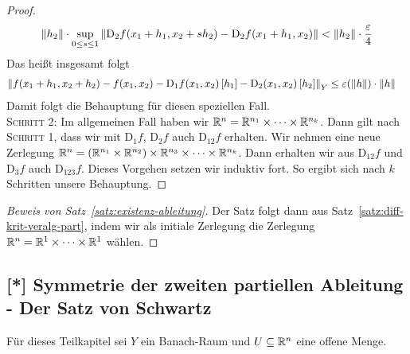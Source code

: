 \begin{satz}
\begin{proof}
\begin{alignat*}{2}
            &&\norm{h_2}\cdot\sup_{0\leq s \leq 1} \norm{\text{D}_2 f\of{x_1 + h_1, x_2 + sh_2} - \text{D}_2 f\of{x_1 + h_1, x_2}} &< \norm{h_2} \cdot \frac{\varepsilon}{4}
        \end{alignat*}
        Das heißt insgesamt folgt
        \begin{align*}
            \norm{f\of{x_1 + h_1, x_2 + h_2} - f\of{x_1, x_2} - \text{D}_1 f\of{x_1, x_2}\interv{h_1} - \text{D}_2\of{x_1, x_2}\interv{h_2}}_Y &\leq \varepsilon\of{\norm{h}}\cdot\norm{h}
        \end{align*}
        Damit folgt die Behauptung für diesen speziellen Fall.\\[5pt] \textsc{Schritt 2}: Im allgemeinen Fall haben wir $\mathbb{R}^n = \mathbb{R}^{n_1}\times\dots\times\mathbb{R}^{n_k}$. Dann gilt nach \textsc{Schritt 1}, dass wir mit $\text{D}_1 f$, $\text{D}_2 f$ auch $\text{D}_{12} f$ erhalten. Wir nehmen eine neue Zerlegung $\mathbb{R}^n = \left(\mathbb{R}^{n_1}\times\mathbb{R}^{n_2}\right)\times \mathbb{R}^{n_3}\times\dots\times\mathbb{R}^{n_k}$. Dann erhalten wir aus $\text{D}_{12} f$ und $\text{D}_3 f$ auch $\text{D}_{123} f$. Dieses Vorgehen setzen wir induktiv fort. So ergibt sich nach $k$ Schritten unsere Behauptung.
    \end{proof}
\end{satz}

\begin{proof}[Beweis von Satz~\ref{satz:existenz-ableitung}]
    Der Satz folgt dann aus Satz~\ref{satz:diff-krit-veralg-part}, indem wir als initiale Zerlegung die Zerlegung $\mathbb{R}^n = \mathbb{R}^{1}\times \dots \times \mathbb{R}^{1}$ wählen.
\end{proof}

\subsection{[*] Symmetrie der zweiten partiellen Ableitung - Der Satz von Schwartz}


\begin{mdframed}
    \begin{center}
        Für dieses Teilkapitel sei $Y$ ein Banach-Raum und $U\subseteq\mathbb{R}^n$ eine offene Menge.
    \end{center}
\end{mdframed}


